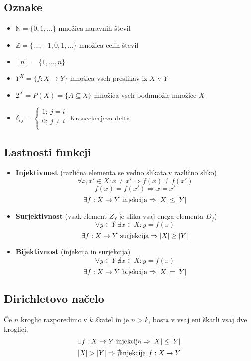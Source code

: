 \documentclass[11pt,a4paper]{article}
\begin{document}
 


\subsection*{Oznake}
\begin{itemize}
    \item $\mathbb{N} = \{0,1,...\}$ množica naravnih števil
    \item $\mathbb{Z} = \{...,-1,0,1,...\}$ množica celih števil
    \item $[n] = \{1,...,n\}$
    \item $Y^X=\{f:X\to Y\}$ množica vseh preslikav iz $X$ v $Y$
    \item $ 2^X = P(X) = \{A \subseteq X\}$ množica vseh podmnožic množice $X$
    \item $ \delta_{i\,j} = \begin{cases}
        1;\ j=i\\
        0;\ j\neq i\\
    \end{cases}$ Kroneckerjeva delta 
\end{itemize}


\subsection*{Lastnosti funkcji}
\begin{itemize}
    \item \textbf{Injektivnost} (različna elementa se vedno slikata v različno sliko)
    \[\forall x,x' \in X : x\neq x' \Rightarrow f(x) \neq f(x')\]
    \[f(x) = f(x') \Rightarrow x = x'\]
    \[\exists f: X \to Y\ \textmd{injekcija} \Rightarrow |X| \leq |Y|\]
    \item \textbf{Surjektivnost} (vsak element $Z_f$ je slika vsaj enega elementa $D_f$)
    \[\forall y \in Y\ \exists x \in X: y = f(x)\]
    \[\exists f: X \to Y\ \textmd{surjekcija} \Rightarrow |X| \geq |Y|\]
    \item \textbf{Bijektivnost} (injekcija in surjekcija)
    \[\forall y \in Y\ \nexists x \in X : y = f(x)\]
    \[\exists f: X \to Y\ \textmd{bijekcija} \Rightarrow |X| = |Y|\]
\end{itemize}


\subsection*{Dirichletovo načelo}
Če $n$ kroglic razporedimo v $k$ škatel in je $n>k$, bosta v vsaj eni škatli vsaj dve kroglici.
\[\exists f: X \to Y\ \textmd{injekcija} \Rightarrow |X| \leq |Y|\]
\[|X| > |Y| \Rightarrow \nexists \textmd{injekcija}\ f: X \to Y \]
\end{document}
